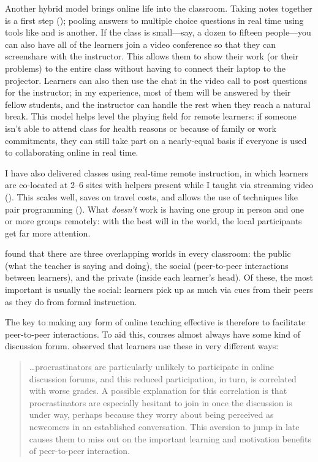 Another hybrid model brings online life into the classroom.
Taking notes together is a first step ();
pooling answers to multiple choice questions in real time
using tools like 
and  is another.
If the class is small---say, a dozen to fifteen people---you can also
have all of the learners join a video conference
so that they can screenshare with the instructor.
This allows them to show their work (or their problems) to the entire class
without having to connect their laptop to the projector.
Learners can also then use the chat in the video call to post questions for the instructor;
in my experience,
most of them will be answered by their fellow students,
and the instructor can handle the rest when they reach a natural break.
This model helps level the playing field for remote learners:
if someone isn't able to attend class for health reasons
or because of family or work commitments,
they can still take part on a nearly-equal basis
if everyone is used to collaborating online in real time.

I have also delivered classes using real-time remote instruction,
in which learners are co-located at 2--6 sites with helpers present
while I taught via streaming video ().
This scales well,
saves on travel costs,
and allows the use of techniques like pair programming ().
What \emph{doesn't} work is having one group in person and one or more groups remotely:
with the best will in the world,
the local participants get far more attention.


\cite{Nuth2007} found that there are three overlapping worlds in every classroom:
the public (what the teacher is saying and doing),
the social (peer-to-peer interactions between learners),
and the private (inside each learner's head).
Of these,
the most important is usually the social:
learners pick up as much via cues from their peers as they do from formal instruction.

The key to making any form of online teaching effective is therefore
to facilitate peer-to-peer interactions.
To aid this,
courses almost always have some kind of discussion forum.
\cite{Mill2016a} observed that learners use these in very different ways:

\begin{quote}

  {\ldots}procrastinators are particularly unlikely to participate in online discussion forums,
  and this reduced participation,
  in turn,
  is correlated with worse grades.
  A possible explanation for this correlation is that
  procrastinators are especially hesitant to join in once the discussion is under way,
  perhaps because they worry about being perceived as newcomers in an established conversation.
  This aversion to jump in late
  causes them to miss out on the important learning and motivation benefits of peer-to-peer interaction.

\end{quote}

